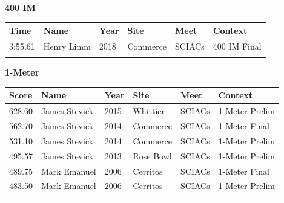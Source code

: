 \vspace{1.2em}
\noindent\begin{minipage}[t]{0.98\textwidth}
\centering
\textbf{\textcolor{teamprimary}{400 IM}}\par
\vspace{0.5em}
\centering
\small
\renewcommand{\arraystretch}{1.0}
\setlength{\tabcolsep}{4pt}
\begin{tabular}{@{}p{2.0cm}p{3.2cm}p{1.2cm}p{2.0cm}p{2.0cm}p{2.5cm}@{}}
\toprule
\textbf{Time} & \textbf{Name} & \textbf{Year} & \textbf{Site} & \textbf{Meet} & \textbf{Context} \\
\midrule
3:55.61 & Henry Limm & 2018 & Commerce & SCIACs & 400 IM Final \\
\bottomrule
\vspace{0.5em}
\end{tabular}
\end{minipage}
\vspace{1.2em}
\noindent\begin{minipage}[t]{0.98\textwidth}
\centering
\textbf{\textcolor{teamprimary}{1-Meter}}\par
\vspace{0.5em}
\centering
\small
\renewcommand{\arraystretch}{1.0}
\setlength{\tabcolsep}{4pt}
\begin{tabular}{@{}p{2.0cm}p{3.2cm}p{1.2cm}p{2.0cm}p{2.0cm}p{2.5cm}@{}}
\toprule
\textbf{Score} & \textbf{Name} & \textbf{Year} & \textbf{Site} & \textbf{Meet} & \textbf{Context} \\
\midrule
628.60 & James Stevick & 2015 & Whittier & SCIACs & 1-Meter Prelim \\
562.70 & James Stevick & 2014 & Commerce & SCIACs & 1-Meter Final \\
531.10 & James Stevick & 2014 & Commerce & SCIACs & 1-Meter Prelim \\
495.57 & James Stevick & 2013 & Rose Bowl & SCIACs & 1-Meter Prelim \\
489.75 & Mark Emanuel & 2006 & Cerritos & SCIACs & 1-Meter Final \\
483.50 & Mark Emanuel & 2006 & Cerritos & SCIACs & 1-Meter Prelim \\
\bottomrule
\vspace{0.5em}
\end{tabular}
\end{minipage}
\vspace{1.2em}
